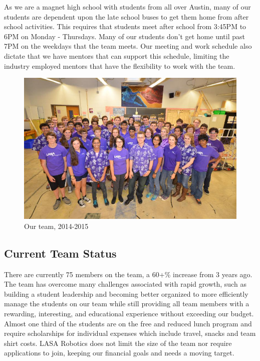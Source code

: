 As we are a magnet high school with students from all over Austin, many of our students are dependent upon the late school buses to get them home from after school activities.  This requires that students meet after school from 3:45PM to 6PM on Monday - Thursdays.  Many of our students don’t get home until past 7PM on the weekdays that the team meets.  Our meeting and work schedule also dictate that we have mentors that can support this schedule, limiting the industry employed mentors that have the flexibility to work with the team.   

\begin{figure}
	\color{darkgray}
	\centering
	\includegraphics[width=\linewidth]{teamorg}
	\caption[]{Our team, 2014-2015}
	\label{fig:team}
\end{figure}

\subsection{Current Team Status}
There are currently 75 members on the team, a 60+\% increase from 3 years ago. The team has overcome many challenges associated with rapid growth, such as building a student leadership and becoming better organized to more efficiently manage the students on our team while still providing all team members with a rewarding, interesting, and educational experience without exceeding our budget. Almost one third of the students are on the free and reduced lunch program and require scholarships for individual expenses which include travel, snacks and team shirt costs. LASA Robotics does not limit the size of the team nor require applications to join, keeping our financial goals and needs a moving target. 

